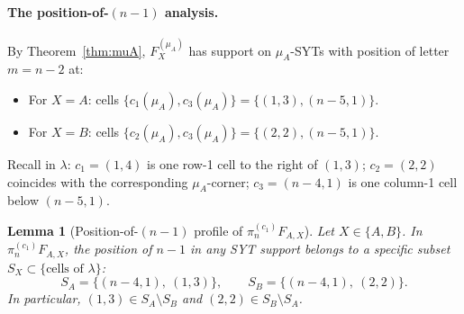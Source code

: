 \documentclass[11pt]{article}
\newtheorem{lemma}[theorem]{Lemma}
\theoremstyle{definition}
\begin{document}
\paragraph{The position-of-$(n-1)$ analysis.}
By Theorem~\ref{thm:muA}, $F_X^{(\mu_A)}$ has support on
$\mu_A$-SYTs with position of letter $m = n - 2$ at:
\begin{itemize}[leftmargin=2em,topsep=0.3em,itemsep=0.2em]
\item For $X = A$: cells $\{c_1(\mu_A), c_3(\mu_A)\} =
\{(1, 3), (n-5, 1)\}$.
\item For $X = B$: cells $\{c_2(\mu_A), c_3(\mu_A)\} =
\{(2, 2), (n-5, 1)\}$.
\end{itemize}
Recall in $\lambda$: $c_1 = (1, 4)$ is one row-1 cell to the right
of $(1, 3)$; $c_2 = (2, 2)$ coincides with the corresponding
$\mu_A$-corner; $c_3 = (n-4, 1)$ is one column-1 cell below
$(n-5, 1)$.

\begin{lemma}[Position-of-$(n-1)$ profile of
$\pi^{(c_1)}_n F_{A,X}$]\label{lem:posnm1}
Let $X \in \{A, B\}$. In $\pi^{(c_1)}_n F_{A,X}$, the position of
$n-1$ in any SYT support belongs to a specific subset $S_X \subset
\{\text{cells of } \lambda\}$:
\[
   S_A = \{(n-4, 1),\ (1, 3)\},\qquad
   S_B = \{(n-4, 1),\ (2, 2)\}.
\]
In particular, $(1, 3) \in S_A \setminus S_B$ and
$(2, 2) \in S_B \setminus S_A$.
\end{lemma}
\end{document}

